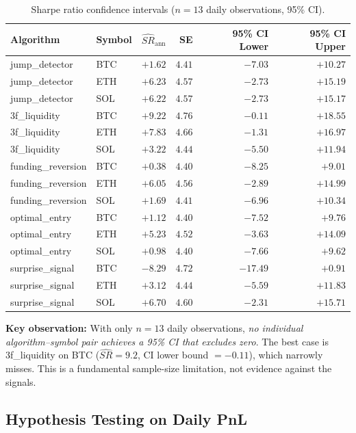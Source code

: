 \documentclass[11pt,a4paper]{article}
\newcommand{\toprule}{\hline\hline}
\newcommand{\midrule}{\hline}
\newcommand{\bottomrule}{\hline\hline}
\begin{document}
\begin{table}[h!]
\centering
\caption{Sharpe ratio confidence intervals ($n = 13$ daily observations, 95\% CI).}
\label{tab:sharpe_ci}
\small
\begin{tabular}{@{}llrrrr@{}}
\toprule
Algorithm & Symbol & $\widehat{SR}_{\text{ann}}$ & SE & 95\% CI Lower & 95\% CI Upper \\
\midrule
jump\_detector & BTC & $+1.62$ & $4.41$ & $-7.03$ & $+10.27$ \\
jump\_detector & ETH & $+6.23$ & $4.57$ & $-2.73$ & $+15.19$ \\
jump\_detector & SOL & $+6.22$ & $4.57$ & $-2.73$ & $+15.17$ \\
\midrule
3f\_liquidity & BTC & $+9.22$ & $4.76$ & $-0.11$ & $+18.55$ \\
3f\_liquidity & ETH & $+7.83$ & $4.66$ & $-1.31$ & $+16.97$ \\
3f\_liquidity & SOL & $+3.22$ & $4.44$ & $-5.50$ & $+11.94$ \\
\midrule
funding\_reversion & BTC & $+0.38$ & $4.40$ & $-8.25$ & $+9.01$ \\
funding\_reversion & ETH & $+6.05$ & $4.56$ & $-2.89$ & $+14.99$ \\
funding\_reversion & SOL & $+1.69$ & $4.41$ & $-6.96$ & $+10.34$ \\
\midrule
optimal\_entry & BTC & $+1.12$ & $4.40$ & $-7.52$ & $+9.76$ \\
optimal\_entry & ETH & $+5.23$ & $4.52$ & $-3.63$ & $+14.09$ \\
optimal\_entry & SOL & $+0.98$ & $4.40$ & $-7.66$ & $+9.62$ \\
\midrule
surprise\_signal & BTC & $-8.29$ & $4.72$ & $-17.49$ & $+0.91$ \\
surprise\_signal & ETH & $+3.12$ & $4.44$ & $-5.59$ & $+11.83$ \\
surprise\_signal & SOL & $+6.70$ & $4.60$ & $-2.31$ & $+15.71$ \\
\bottomrule
\end{tabular}
\end{table}

\textbf{Key observation:} With only $n = 13$ daily observations, \textit{no individual algorithm--symbol pair achieves a 95\% CI that excludes zero}. The best case is 3f\_liquidity on BTC ($\widehat{SR} = 9.2$, CI lower bound $= -0.11$), which narrowly misses. This is a fundamental sample-size limitation, not evidence against the signals.

\subsection{Hypothesis Testing on Daily PnL}
\end{document}
